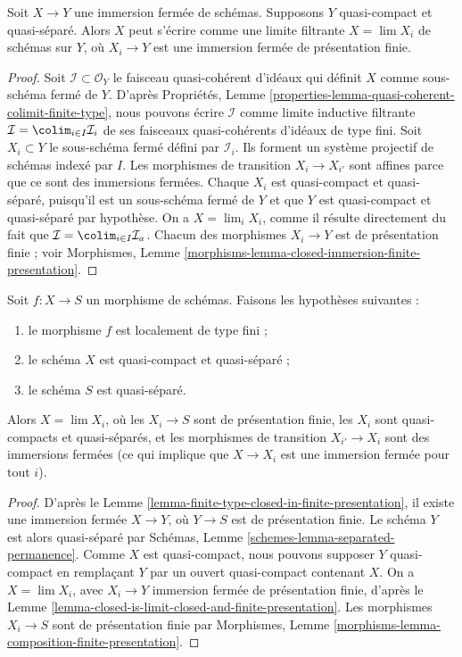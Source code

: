 \begin{lemma}
\label{lemma-closed-is-limit-closed-and-finite-presentation}
Soit $X \to Y$ une immersion fermée de schémas. Supposons $Y$ quasi-compact
et quasi-séparé. Alors $X$ peut s'écrire comme une limite filtrante
$X = \lim X_i$ de schémas sur $Y$, où $X_i \to Y$ est une immersion fermée
de présentation finie.
\end{lemma}

\begin{proof}
Soit $\mathcal{I} \subset \mathcal{O}_Y$ le faisceau quasi-cohérent d'idéaux
qui définit $X$ comme sous-schéma fermé de $Y$. D'après Propriétés,
Lemme \ref{properties-lemma-quasi-coherent-colimit-finite-type}, nous pouvons
écrire $\mathcal{I}$ comme limite inductive filtrante
$\mathcal{I} = \colim_{i \in I} \mathcal{I}_i$ de ses faisceaux
quasi-cohérents d'idéaux de type fini. Soit $X_i \subset Y$ le sous-schéma
fermé défini par $\mathcal{I}_i$. Ils forment un système projectif de schémas
indexé par $I$. Les morphismes de transition $X_i \to X_{i'}$ sont affines
parce que ce sont des immersions fermées. Chaque $X_i$ est quasi-compact et
quasi-séparé, puisqu'il est un sous-schéma fermé de $Y$ et que $Y$ est
quasi-compact et quasi-séparé par hypothèse. On a $X = \lim_i X_i$, comme il
résulte directement du fait que
$\mathcal{I} = \colim_{i \in I} \mathcal{I}_a$. Chacun des morphismes
$X_i \to Y$ est de présentation finie ; voir Morphismes,
Lemme \ref{morphisms-lemma-closed-immersion-finite-presentation}.
\end{proof}

\begin{lemma}
\label{lemma-finite-type-is-limit-finite-presentation}
Soit $f : X \to S$ un morphisme de schémas. Faisons les hypothèses suivantes :
\begin{enumerate}
\item le morphisme $f$ est localement de type fini ;
\item le schéma $X$ est quasi-compact et quasi-séparé ;
\item le schéma $S$ est quasi-séparé.
\end{enumerate}
Alors $X = \lim X_i$, où les $X_i \to S$ sont de présentation finie, les
$X_i$ sont quasi-compacts et quasi-séparés, et les morphismes de transition
$X_{i'} \to X_i$ sont des immersions fermées (ce qui implique que
$X \to X_i$ est une immersion fermée pour tout $i$).
\end{lemma}

\begin{proof}
D'après le Lemme \ref{lemma-finite-type-closed-in-finite-presentation}, il
existe une immersion fermée $X \to Y$, où $Y \to S$ est de présentation
finie. Le schéma $Y$ est alors quasi-séparé par Schémas,
Lemme \ref{schemes-lemma-separated-permanence}. Comme $X$ est quasi-compact,
nous pouvons supposer $Y$ quasi-compact en remplaçant $Y$ par un ouvert
quasi-compact contenant $X$. On a $X = \lim X_i$, avec
$X_i \to Y$ immersion fermée de présentation finie, d'après le
Lemme \ref{lemma-closed-is-limit-closed-and-finite-presentation}.
Les morphismes $X_i \to S$ sont de présentation finie par Morphismes,
Lemme \ref{morphisms-lemma-composition-finite-presentation}.
\end{proof}

